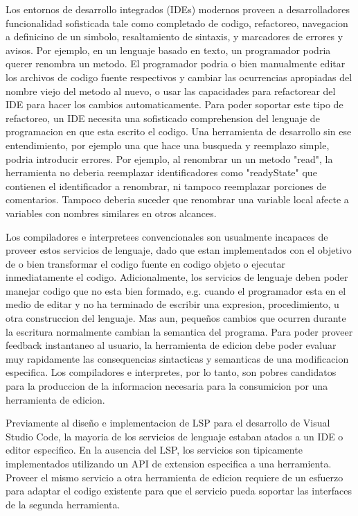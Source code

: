 \documentclass[12pt, a4paper]{report}
\begin{document}
Los entornos de desarrollo integrados (IDEs) modernos proveen a desarrolladores funcionalidad sofisticada tale como completado de codigo, refactoreo, navegacion a definicino de un simbolo, resaltamiento de sintaxis, y marcadores de errores y avisos.
Por ejemplo, en un lenguaje basado en texto, un programador podria querer renombra un metodo.
El programador podria o bien manualmente editar los archivos de codigo fuente respectivos y cambiar las ocurrencias apropiadas del nombre viejo del metodo al nuevo, o usar las capacidades para refactorear del IDE para hacer los cambios automaticamente.
Para poder soportar este tipo de refactoreo, un IDE necesita una sofisticado comprehension del lenguaje de programacion en que esta escrito el codigo.
Una herramienta de desarrollo sin ese entendimiento, por ejemplo una que hace una busqueda y reemplazo simple, podria introducir errores.
Por ejemplo, al renombrar un un metodo "read", la herramienta no deberia reemplazar identificadores como "readyState" que contienen el identificador a renombrar, ni tampoco reemplazar porciones de comentarios. Tampoco deberia suceder que renombrar una variable local afecte a variables con nombres similares en otros alcances.
\cite{language_server_protocol_wiki}

Los compiladores e interpretees convencionales son usualmente incapaces de proveer estos servicios de lenguaje, dado que estan implementados con el objetivo de o bien transformar el codigo fuente en codigo objeto o ejecutar inmediatamente el codigo.
Adicionalmente, los servicios de lenguaje deben poder manejar codigo que no esta bien formado, e.g. cuando el programador esta en el medio de editar y no ha terminado de escribir una expresion, procedimiento, u otra construccion del lenguaje.
Mas aun, pequeños cambios que ocurren durante la escritura normalmente cambian la semantica del programa.
Para poder proveer feedback instantaneo al usuario, la herramienta de edicion debe poder evaluar muy rapidamente las consequencias sintacticas y semanticas de una modificacion especifica.
Los compiladores e interpretes, por lo tanto, son pobres candidatos para la produccion de la informacion necesaria para la consumicion por una herramienta de edicion.
\cite{language_server_protocol_wiki}

Previamente al diseño e implementacion de LSP para el desarrollo de Visual Studio Code, la mayoria de los servicios de lenguaje estaban atados a un IDE o editor especifico.
En la ausencia del LSP, los servicios son tipicamente implementados utilizando un API de extension especifica a una herramienta.
Proveer el mismo servicio a otra herramienta de edicion requiere de un esfuerzo para adaptar el codigo existente para que el servicio pueda soportar las interfaces de la segunda herramienta.
\cite{language_server_protocol_wiki}
\end{document}
